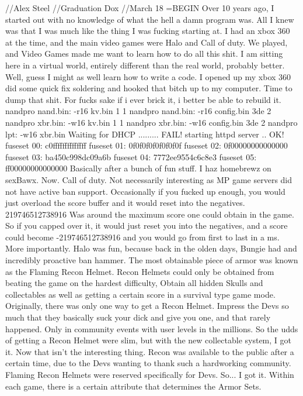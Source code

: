 //Alex Steel
//Graduation Dox
//March 18
=BEGIN
Over 10 years ago, I started out with no knowledge of what the hell a damn program was.
All I knew was that I was much like the thing I was fucking starting at.
I had an xbox 360 at the time, and the main video games were Halo and Call of duty.
We played, and Video Games made me want to learn how to do all this shit.
I am sitting here in a virtual world, entirely different than the real world, probably better.
Well, guess I might as well learn how to write a code.
I opened up my xbox 360 did some quick fix soldering and hooked that bitch up to my computer.
Time to dump that shit. For fucks sake if i ever brick it, i better be able to rebuild it.
nandpro nand.bin: -r16 kv.bin 1 1
nandpro nand.bin: -r16 config.bin 3de 2
nandpro xbr.bin: -w16 kv.bin 1 1
nandpro xbr.bin: -w16 config.bin 3de 2
nandpro lpt: -w16 xbr.bin
Waiting for DHCP ......... FAIL!
starting httpd server .. OK!
fuseset 00: c0ffffffffffffff
fuseset 01: 0f0f0f0f0f0f0f0f
fuseset 02: 0f00000000000000
fuseset 03: ba450c998dc09a6b
fuseset 04: 7772ee9554c6c8e3
fuseset 05: ff00000000000000
Basically after a bunch of fun stuff. I haz homebrewz on sexBawx.
Now. Call of duty. Not necessarily interesting as MP game servers 
did not have active ban support. Occasionally if you fucked up enough, 
you would just overload the score buffer and it would reset into the negatives.
219746512738916 Was around the maximum score one could obtain in the game.
So if you capped over it, it would just reset you into the negatives, and a score
could become -219746512738916 and you would go from first to last in a ms.
More importantly. Halo was fun, because back in the olden days, Bungie had
and incredibly proactive ban hammer. The most obtainable piece of armor
was known as the Flaming Recon Helmet. Recon Helmets could only be obtained
from beating the game on the hardest difficulty, Obtain all hidden Skulls and collectables
as well as getting a certain score in a survival type game mode. Originally, there was only
one way to get a Recon Helmet. Impress the Devs so much that they basically suck your dick
and give you one, and that rarely happened. Only in community events with user levels in the millions.
So the udds of getting a Recon Helmet were slim, but with the new collectable system, I got it.
Now that isn't the interesting thing. Recon was available to the public after a certain time,
due to the Devs wanting to thank such a hardworking community. Flaming Recon Helmets were
reserved specifically for Devs. 
So... I got it.
Within each game, there is a certain attribute that determines the Armor Sets.
